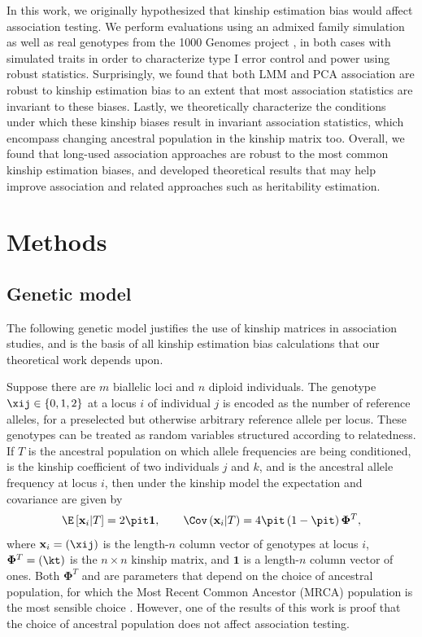\documentclass[11pt]{article}
\newcommand{\kinMat}[1][T]{%
  \ensuremath{%
    \mathbf{\Phi}^{#1}
  }%
  \xspace%
}%
\begin{document}
In this work, we originally hypothesized that kinship estimation bias would affect association testing.
We perform evaluations using an admixed family simulation \citep{yao_limitations_2022} as well as real genotypes from the 1000 Genomes project \citep{the_1000_genomes_project_consortium_map_2010, 1000_genomes_project_consortium_integrated_2012, fairley_international_2020}, in both cases with simulated traits in order to characterize type I error control and power using robust statistics.
Surprisingly, we found that both LMM and PCA association are robust to kinship estimation bias to an extent that most association statistics are invariant to these biases.
Lastly, we theoretically characterize the conditions under which these kinship biases result in invariant association statistics, which encompass changing ancestral population in the kinship matrix too.
Overall, we found that long-used association approaches are robust to the most common kinship estimation biases, and developed theoretical results that may help improve association and related approaches such as heritability estimation.


\section{Methods}

\subsection{Genetic model}

The following genetic model justifies the use of kinship matrices in association studies, and is the basis of all kinship estimation bias calculations that our theoretical work depends upon.

Suppose there are $m$ biallelic loci and $n$ diploid individuals.
The genotype $\xij \in \{0,1,2\}$ at a locus $i$ of individual $j$ is encoded as the number of reference alleles, for a preselected but otherwise arbitrary reference allele per locus.
These genotypes can be treated as random variables structured according to relatedness.
If $T$ is the ancestral population on which allele frequencies are being conditioned, \kt is the kinship coefficient of two individuals $j$ and $k$, and \pit is the ancestral allele frequency at locus $i$, then under the kinship model \citep{ochoa_estimating_2021} the expectation and covariance are given by
\begin{align*}
  \E \left[ \mathbf{x}_i \middle| T \right]
  =
    2 \pit \mathbf{1}
  ,
  \quad\quad
  \Cov \left(\mathbf{x}_i \middle| T \right)
  =
    4 \pit \left( 1 - \pit \right) \kinMat
    ,
\end{align*}
where $\mathbf{x}_i = (\xij)$ is the length-$n$ column vector of genotypes at locus $i$, $\kinMat = (\kt)$ is the $n \times n$ kinship matrix, and $\mathbf{1}$ is a length-$n$ column vector of ones.
Both \kinMat and \pit are parameters that depend on the choice of ancestral population, for which the Most Recent Common Ancestor (MRCA) population is the most sensible choice \citep{ochoa_estimating_2021}.
However, one of the results of this work is proof that the choice of ancestral population does not affect association testing.
\end{document}
